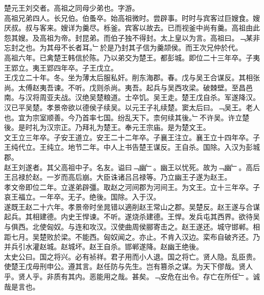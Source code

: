 \documentclass{zhvt-classic}
\begin{document}

\hspace*{2em}楚元王刘交者。高祖之同母少弟也。字游。\\
\hspace*{2em}高祖兄弟四人。长兄伯。伯蚤卒。始高祖微时。尝辟事。时时与宾客过巨嫂食。嫂厌叔。叔与客来。嫂详为羹尽。栎釜。宾客以故去。已而视釜中尚有羹。高祖由此怨其嫂。及高祖为帝。封昆弟。而伯子独不得封。太上皇以为言。高祖曰。﹁某非忘封之也。为其母不长者耳。﹂於是乃封其子信为羹颉侯。而王次兄仲於代。\\
\hspace*{2em}高祖六年。已禽楚王韩信於陈。乃以弟交为楚王。都彭城。即位二十三年卒。子夷王郢立。夷王郢四年卒。子王戊立。\\
\hspace*{2em}王戊立二十年。冬。坐为薄太后服私奸。削东海郡。春。戊与吴王合谋反。其相张尚。太傅赵夷吾谏。不听。戊则杀尚。夷吾。起兵与吴西攻梁。破棘壁。至昌邑南。与汉将周亚夫战。汉绝吴楚粮道。士卒饥。吴王走。楚王戊自杀。军遂降汉。\\
\hspace*{2em}汉已平吴楚。孝景帝欲以德侯子续吴。以元王子礼续楚。窦太后曰。﹁吴王。老人也。宜为宗室顺善。今乃首率七国。纷乱天下。柰何续其後。﹂不许吴。许立楚後。是时礼为汉宗正。乃拜礼为楚王。奉元王宗庙。是为楚文王。\\
\hspace*{2em}文王立三年卒。子安王道立。安王二十二年卒。子襄王注立。襄王立十四年卒。子王纯代立。王纯立。地节二年。中人上书告楚王谋反。王自杀。国除。入汉为彭城郡。\\
\hspace*{2em}赵王刘遂者。其父高祖中子。名友。谥曰﹁幽﹂。幽王以忧死。故为﹁幽﹂。高后王吕禄於赵。一岁而高后崩。大臣诛诸吕吕禄等。乃立幽王子遂为赵王。\\
\hspace*{2em}孝文帝即位二年。立遂弟辟彊。取赵之河间郡为河间王。为文王。立十三年卒。子哀王福立。一年卒。无子。绝後。国除。入于汉。\\
\hspace*{2em}遂既王赵二十六年。孝景帝时坐晁错以適削赵王常山之郡。吴楚反。赵王遂与合谋起兵。其相建德。内史王悍谏。不听。遂烧杀建德。王悍。发兵屯其西界。欲待吴与俱西。北使匈奴。与连和攻汉。汉使曲周侯郦寄击之。赵王遂还。城守邯郸。相距七月。吴楚败於梁。不能西。匈奴闻之。亦止。不肯入汉边。栾布自破齐还。乃并兵引水灌赵城。赵城坏。赵王自杀。邯郸遂降。赵幽王绝後。\\
\hspace*{2em}太史公曰。国之将兴。必有祯祥。君子用而小人退。国之将亡。贤人隐。乱臣贵。使楚王戊毋刑申公。遵其言。赵任防与先生。岂有篡杀之谋。为天下僇哉。贤人乎。贤人乎。非质有其内。恶能用之哉。甚矣。﹁安危在出令。存亡在所任﹂。诚哉是言也。\\
\end{document}
